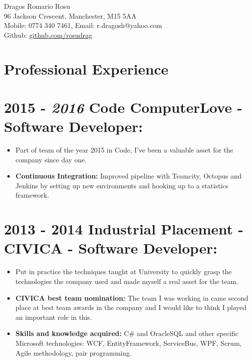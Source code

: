 \documentclass[12pt,a4paper]{res}
\begin{document}
\thispagestyle{empty}
  \begin{center}
  \Large{Dragos Romario Rosu  \\ [12pt]}
  \normalsize 96 Jackson Crescent, Manchester, M15 5AA\\
  Mobile: 0774 340 7461, Email: r.dragosh@yahoo.com\\
  Github: \url{github.com/rosudrag}
  \end{center}
  
\begin{resume}
\vspace{-10mm}
\section{\large\bf Professional Experience}

\section{\bf 2015 - \textit{2016} \hspace{0.3mm} Code ComputerLove - Software Developer:}
\vspace{5mm}    
	\begin{itemize}
	\item[] Part of team of the year 2015 in Code, I've been a valuable asset for the company since day one. 
	\item \textbf{Continuous Integration:} Improved pipeline with Teamcity, Octopus and Jenkins by setting up new environments and hooking up to a statistics framework.
	\end{itemize}
	
\section{\bf 2013 - 2014 \hspace{0.5mm} Industrial Placement - CIVICA - Software Developer:}
\vspace{5mm}    
	\begin{itemize}
	\item[] Put in practice the techniques taught at University to quickly grasp the technologies the company used and made myself a real asset for the team.
	\item{\bf CIVICA best team nomination:} The team I was working in came second place at best team awards in the company and I would like to think I played an important role in this.
	\item{\bf Skills and knowledge acquired:} C\# and OracleSQL and other specific Microsoft technologies: WCF, EntityFramework, ServiceBus, WPF, Scrum, Agile methodology, pair programming.
	\end{itemize}



\end{resume}
\end{document}
